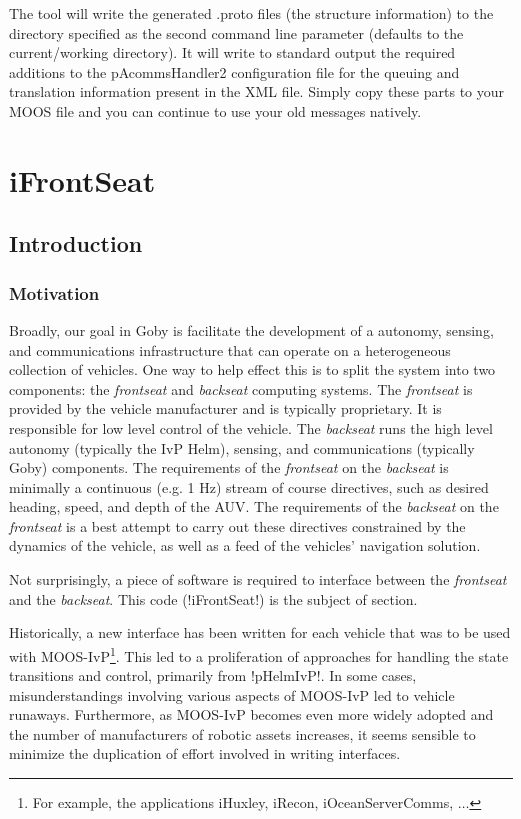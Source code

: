 The tool will write the generated .proto files (the structure information) to the directory specified as the second command line parameter (defaults to the current/working directory). It will write to standard output the required additions to the pAcommsHandler2 configuration file for the queuing and translation information present in the XML file. Simply copy these parts to your MOOS file and you can continue to use your old messages natively.


\section{iFrontSeat}
\label{sec:ifrontseat} 

\subsection{Introduction}

\subsubsection{Motivation}
Broadly, our goal in Goby is facilitate the development of a autonomy, sensing, and communications infrastructure that can operate on a heterogeneous collection of vehicles. One way to help effect this is to split the system into two components: the \textit{frontseat} and \textit{backseat} computing systems. The \textit{frontseat} is provided by the vehicle manufacturer and is typically proprietary. It is responsible for low level control of the vehicle. The \textit{backseat} runs the high level autonomy (typically the IvP Helm), sensing, and communications (typically Goby) components. The requirements of the \textit{frontseat} on the \textit{backseat} is minimally a continuous (e.g. 1 Hz) stream of course directives, such as desired heading, speed, and depth of the AUV. The requirements of the \textit{backseat} on the \textit{frontseat} is a best attempt to carry out these directives constrained by the dynamics of the vehicle, as well as a feed of the vehicles' navigation solution.

Not surprisingly, a piece of software is required to interface between the \textit{frontseat} and the \textit{backseat}. This code (!iFrontSeat!) is the subject of section.

Historically, a new interface has been written for each vehicle that was to be used with MOOS-IvP\footnote{For example, the applications iHuxley, iRecon, iOceanServerComms, $\ldots$}. This led to a proliferation of approaches for handling the state transitions and control, primarily from !pHelmIvP!. In some cases, misunderstandings involving various aspects of MOOS-IvP led to vehicle runaways. Furthermore, as MOOS-IvP becomes even more widely adopted and the number of manufacturers of robotic assets increases, it seems sensible to minimize the duplication of effort involved in writing interfaces.


